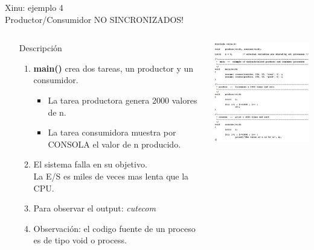 \documentclass[8pt,aspectratio=169,compress]{beamer}
\begin{document}
\begin{frame}[fragile]{Xinu: ejemplo 4 \\ Productor/Consumidor NO SINCRONIZADOS!}

    \begin{columns}[onlytextwidth,T]
      \column{\dimexpr\linewidth-70mm-5mm}

\begin{small}
\begin{itemize}
\bigskip
  \item[Descripción]
\begin{enumerate}
\item \textbf{main()} crea dos tareas, un productor y un consumidor.
	\begin{itemize}
\item La tarea productora genera 2000 valores de n.
\item La tarea consumidora muestra por CONSOLA el valor de n producido.
	\end{itemize}

\bigskip
\item El sistema falla en su objetivo.\\ La E/S es miles de veces mas lenta que la CPU.
\bigskip
\item Para observar el output: \textit{cutecom}
\bigskip
\item Observación: el codigo fuente de un proceso es de tipo void o process.
\end{enumerate}
	\end{itemize}

\end{small}

      \column{70mm}
     \includegraphics[width=66mm]{images/xinu-ejemplo4.jpg}

    \end{columns}
\end{frame}
\end{document}
